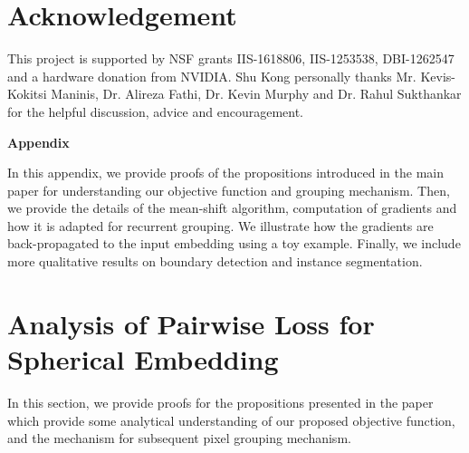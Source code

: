 \documentclass[10pt,twocolumn,letterpaper]{article}
\begin{document}
\section*{Acknowledgement}
This project is supported by NSF grants
IIS-1618806, IIS-1253538, DBI-1262547 and a hardware donation
from NVIDIA.
Shu Kong personally thanks Mr. Kevis-Kokitsi Maninis,
Dr. Alireza Fathi, Dr. Kevin Murphy and Dr. Rahul Sukthankar for the helpful discussion, advice and encouragement.


{\small


}

\clearpage\mbox{}

\begin{center}{\large \textbf{Appendix}}
\end{center}

In this appendix, we provide proofs of the propositions
introduced in the main paper for understanding our objective function and
grouping mechanism.  Then, we provide the details of the mean-shift algorithm,
computation of gradients and how it is adapted for recurrent grouping.  We
illustrate how the gradients are back-propagated to the input embedding using a
toy example.
Finally, we include more qualitative results on boundary detection and instance
segmentation.


\setcounter{section}{0}\setcounter{propositions}{0}\section{Analysis of Pairwise Loss for Spherical Embedding}
In this section, we provide proofs for the propositions presented in the paper
which provide some analytical understanding of our proposed objective function,
and the mechanism for subsequent pixel grouping mechanism.
\end{document}
